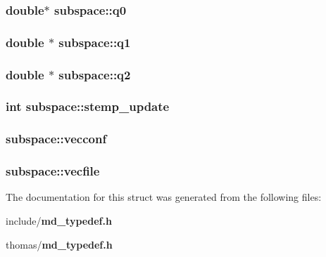 \subsubsection{\setlength{\rightskip}{0pt plus 5cm}double$\ast$ {\bf subspace::q0}}\label{structsubspace_4cc78d78f481ad1bf6bcb6300015c8b9}


\subsubsection{\setlength{\rightskip}{0pt plus 5cm}double $\ast$ {\bf subspace::q1}}\label{structsubspace_0a39158e6341b8ede8626263437f8cf6}


\subsubsection{\setlength{\rightskip}{0pt plus 5cm}double $\ast$ {\bf subspace::q2}}\label{structsubspace_345646f4ce3dc7e5230650806efce23f}


\subsubsection{\setlength{\rightskip}{0pt plus 5cm}int {\bf subspace::stemp\_\-update}}\label{structsubspace_1759bceeaae6cb9afb4d6f2a6a5268c8}


\subsubsection{ {\bf subspace::vecconf}}\label{structsubspace_7634ee38ce31754435162f4b73238fb2}


\subsubsection{ {\bf subspace::vecfile}}\label{structsubspace_bc8840761f4bc473b7d4fc7042cccea5}




The documentation for this struct was generated from the following files:\begin{CompactItemize}
\item 
include/{\bf md\_\-typedef.h}\item 
thomas/{\bf md\_\-typedef.h}\end{CompactItemize}
